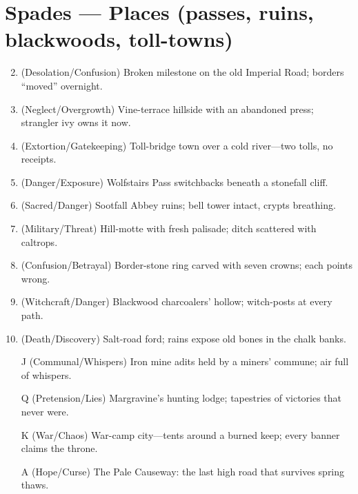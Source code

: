 \section*{Spades --- Places (passes, ruins, blackwoods, toll-towns)}
\label{sec:acasia-places}
\begin{enumerate}
\setcounter{enumi}{1}
\item (Desolation/Confusion) Broken milestone on the old Imperial Road; borders ``moved'' overnight.
\item (Neglect/Overgrowth) Vine-terrace hillside with an abandoned press; strangler ivy owns it now.
\item (Extortion/Gatekeeping) Toll-bridge town over a cold river---two tolls, no receipts.
\item (Danger/Exposure) Wolfstairs Pass switchbacks beneath a stonefall cliff.
\item (Sacred/Danger) Sootfall Abbey ruins; bell tower intact, crypts breathing.
\item (Military/Threat) Hill-motte with fresh palisade; ditch scattered with caltrops.
\item (Confusion/Betrayal) Border-stone ring carved with seven crowns; each points wrong.
\item (Witchcraft/Danger) Blackwood charcoalers' hollow; witch-posts at every path.
\item (Death/Discovery) Salt-road ford; rains expose old bones in the chalk banks.
\item[J] (Communal/Whispers) Iron mine adits held by a miners' commune; air full of whispers.
\item[Q] (Pretension/Lies) Margravine's hunting lodge; tapestries of victories that never were.
\item[K] (War/Chaos) War-camp city---tents around a burned keep; every banner claims the throne.
\item[A] (Hope/Curse) The Pale Causeway: the last high road that survives spring thaws.
\end{enumerate}

